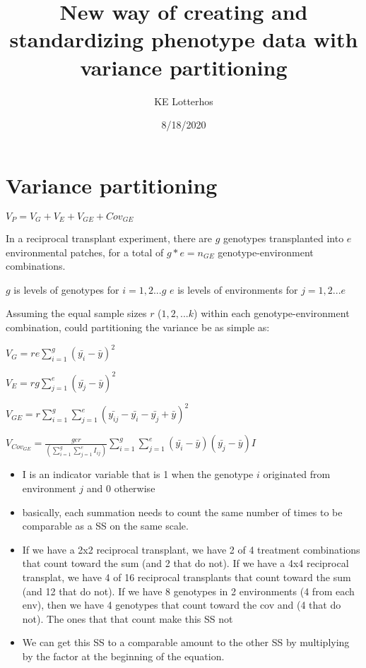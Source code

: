 \documentclass[]{article}
\title{New way of creating and standardizing phenotype data with variance
partitioning}
\author{KE Lotterhos}
\date{8/18/2020}
\providecommand{\tightlist}{%
  \setlength{\itemsep}{0pt}\setlength{\parskip}{0pt}}
\begin{document}
\maketitle

\hypertarget{variance-partitioning}{%
\section{Variance partitioning}\label{variance-partitioning}}

\(V_P = V_G + V_E + V_{GE} + Cov_{GE}\)

In a reciprocal transplant experiment, there are \(g\) genotypes
transplanted into \(e\) environmental patches, for a total of
\(g*e = n_{GE}\) genotype-environment combinations.

\(g\) is levels of genotypes for \(i = 1,2... g\) \(e\) is levels of
environments for \(j = 1,2... e\)

Assuming the equal sample sizes \(r\) (\(1, 2, ...k\)) within each
genotype-environment combination, could partitioning the variance be as
simple as:

\(V_G = re\sum_{i=1}^g (\bar{y_i} - \bar{y})^2\)

\(V_E = rg\sum_{j=1}^e (\bar{y_j} - \bar{y})^2\)

\(V_{GE} = r \sum_{i=1}^g \sum_{j=1}^e (\bar{y_{ij}} - \bar{y_i} - \bar{y_j} + \bar{y})^2\)

\(V_{Cov_{GE}}= \frac{ger}{(\sum_{i=1}^g\sum_{j=1}^eI_{ij})} \sum_{i=1}^g\sum_{j=1}^e(\bar{y_i} - \bar{y})(\bar{y_j} - \bar{y})I\)

\begin{itemize}
\tightlist
\item
  I is an indicator variable that is 1 when the genotype \(i\)
  originated from environment \(j\) and 0 otherwise
\item
  basically, each summation needs to count the same number of times to
  be comparable as a SS on the same scale.
\item
  If we have a 2x2 reciprocal transplant, we have 2 of 4 treatment
  combinations that count toward the sum (and 2 that do not). If we have
  a 4x4 reciprocal transplat, we have 4 of 16 reciprocal transplants
  that count toward the sum (and 12 that do not). If we have 8 genotypes
  in 2 environments (4 from each env), then we have 4 genotypes that
  count toward the cov and (4 that do not). The ones that that count
  make this SS not
\item
  We can get this SS to a comparable amount to the other SS by
  multiplying by the factor at the beginning of the equation.
\end{itemize}
\end{document}
